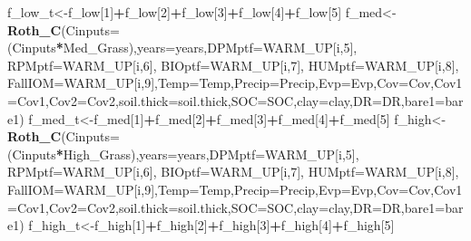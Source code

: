 \documentclass[
  10pt,
  b5paper,
]{book}
\newenvironment{Shaded}{\begin{snugshade}}{\end{snugshade}}
\newcommand{\DataTypeTok}[1]{\textcolor[rgb]{0.13,0.29,0.53}{#1}}
\newcommand{\DecValTok}[1]{\textcolor[rgb]{0.00,0.00,0.81}{#1}}
\newcommand{\KeywordTok}[1]{\textcolor[rgb]{0.13,0.29,0.53}{\textbf{#1}}}
\newcommand{\NormalTok}[1]{#1}
\newcommand{\OperatorTok}[1]{\textcolor[rgb]{0.81,0.36,0.00}{\textbf{#1}}}
\begin{document}
\begin{Shaded}
\begin{Highlighting}[]
\NormalTok{f_low_t<-f_low[}\DecValTok{1}\NormalTok{]}\OperatorTok{+}\NormalTok{f_low[}\DecValTok{2}\NormalTok{]}\OperatorTok{+}\NormalTok{f_low[}\DecValTok{3}\NormalTok{]}\OperatorTok{+}\NormalTok{f_low[}\DecValTok{4}\NormalTok{]}\OperatorTok{+}\NormalTok{f_low[}\DecValTok{5}\NormalTok{]}
\NormalTok{f_med<-}\KeywordTok{Roth_C}\NormalTok{(}\DataTypeTok{Cinputs=}\NormalTok{(Cinputs}\OperatorTok{*}\NormalTok{Med_Grass),}\DataTypeTok{years=}\NormalTok{years,}\DataTypeTok{DPMptf=}\NormalTok{WARM_UP[i,}\DecValTok{5}\NormalTok{], }\DataTypeTok{RPMptf=}\NormalTok{WARM_UP[i,}\DecValTok{6}\NormalTok{], }\DataTypeTok{BIOptf=}\NormalTok{WARM_UP[i,}\DecValTok{7}\NormalTok{], }\DataTypeTok{HUMptf=}\NormalTok{WARM_UP[i,}\DecValTok{8}\NormalTok{], }\DataTypeTok{FallIOM=}\NormalTok{WARM_UP[i,}\DecValTok{9}\NormalTok{],}\DataTypeTok{Temp=}\NormalTok{Temp,}\DataTypeTok{Precip=}\NormalTok{Precip,}\DataTypeTok{Evp=}\NormalTok{Evp,}\DataTypeTok{Cov=}\NormalTok{Cov,}\DataTypeTok{Cov1=}\NormalTok{Cov1,}\DataTypeTok{Cov2=}\NormalTok{Cov2,}\DataTypeTok{soil.thick=}\NormalTok{soil.thick,}\DataTypeTok{SOC=}\NormalTok{SOC,}\DataTypeTok{clay=}\NormalTok{clay,}\DataTypeTok{DR=}\NormalTok{DR,}\DataTypeTok{bare1=}\NormalTok{bare1)}
\NormalTok{f_med_t<-f_med[}\DecValTok{1}\NormalTok{]}\OperatorTok{+}\NormalTok{f_med[}\DecValTok{2}\NormalTok{]}\OperatorTok{+}\NormalTok{f_med[}\DecValTok{3}\NormalTok{]}\OperatorTok{+}\NormalTok{f_med[}\DecValTok{4}\NormalTok{]}\OperatorTok{+}\NormalTok{f_med[}\DecValTok{5}\NormalTok{]}
\NormalTok{f_high<-}\KeywordTok{Roth_C}\NormalTok{(}\DataTypeTok{Cinputs=}\NormalTok{(Cinputs}\OperatorTok{*}\NormalTok{High_Grass),}\DataTypeTok{years=}\NormalTok{years,}\DataTypeTok{DPMptf=}\NormalTok{WARM_UP[i,}\DecValTok{5}\NormalTok{], }\DataTypeTok{RPMptf=}\NormalTok{WARM_UP[i,}\DecValTok{6}\NormalTok{], }\DataTypeTok{BIOptf=}\NormalTok{WARM_UP[i,}\DecValTok{7}\NormalTok{], }\DataTypeTok{HUMptf=}\NormalTok{WARM_UP[i,}\DecValTok{8}\NormalTok{], }\DataTypeTok{FallIOM=}\NormalTok{WARM_UP[i,}\DecValTok{9}\NormalTok{],}\DataTypeTok{Temp=}\NormalTok{Temp,}\DataTypeTok{Precip=}\NormalTok{Precip,}\DataTypeTok{Evp=}\NormalTok{Evp,}\DataTypeTok{Cov=}\NormalTok{Cov,}\DataTypeTok{Cov1=}\NormalTok{Cov1,}\DataTypeTok{Cov2=}\NormalTok{Cov2,}\DataTypeTok{soil.thick=}\NormalTok{soil.thick,}\DataTypeTok{SOC=}\NormalTok{SOC,}\DataTypeTok{clay=}\NormalTok{clay,}\DataTypeTok{DR=}\NormalTok{DR,}\DataTypeTok{bare1=}\NormalTok{bare1)}
\NormalTok{f_high_t<-f_high[}\DecValTok{1}\NormalTok{]}\OperatorTok{+}\NormalTok{f_high[}\DecValTok{2}\NormalTok{]}\OperatorTok{+}\NormalTok{f_high[}\DecValTok{3}\NormalTok{]}\OperatorTok{+}\NormalTok{f_high[}\DecValTok{4}\NormalTok{]}\OperatorTok{+}\NormalTok{f_high[}\DecValTok{5}\NormalTok{]}

\end{Highlighting}
\end{Shaded}
\end{document}
